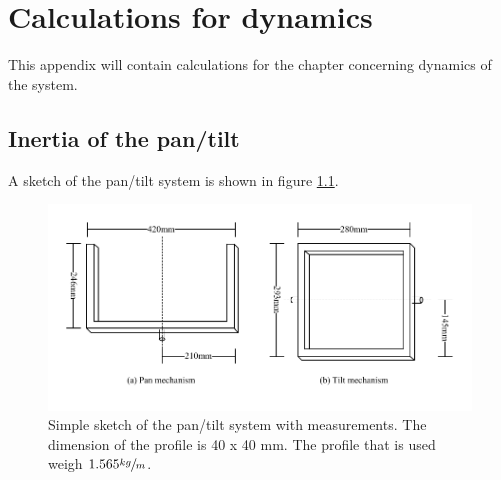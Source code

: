 \chapter{Calculations for dynamics}\label{app:dynamics_calc}
This appendix will contain calculations for the chapter concerning dynamics of the system.

\section{Inertia of the pan/tilt}
A sketch of the pan/tilt system is shown in figure \ref{fig:pan_tilt_sketch}.
\begin{figure}[htb]
	\centering
	\includegraphics[width=\textwidth,trim=0 20 0 10]{graphics/pan_tilt_sketch.pdf} %
	\caption{Simple sketch of the pan/tilt system with measurements. The dimension of the profile is 40 x 40 mm. The profile that is used weigh $1.565\sfrac{kg}{m}$.}
	\label{fig:pan_tilt_sketch}			%
\end{figure}

